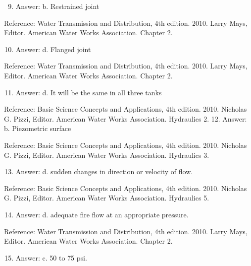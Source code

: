 \documentclass[10pt]{article}
\begin{document}
\begin{enumerate}
  \setcounter{enumi}{8}
  \item Answer: b. Restrained joint
\end{enumerate}

Reference: Water Transmission and Distribution, 4th edition. 2010. Larry Mays, Editor. American Water Works Association. Chapter 2.

\begin{enumerate}
  \setcounter{enumi}{9}
  \item Answer: d. Flanged joint
\end{enumerate}

Reference: Water Transmission and Distribution, 4th edition. 2010. Larry Mays, Editor. American Water Works Association. Chapter 2.

\begin{enumerate}
  \setcounter{enumi}{10}
  \item Answer: d. It will be the same in all three tanks
\end{enumerate}

Reference: Basic Science Concepts and Applications, 4th edition. 2010. Nicholas G. Pizzi, Editor. American Water Works Association. Hydraulics 2. 12. Answer: b. Piezometric surface

Reference: Basic Science Concepts and Applications, 4th edition. 2010. Nicholas G. Pizzi, Editor. American Water Works Association. Hydraulics 3.

\begin{enumerate}
  \setcounter{enumi}{12}
  \item Answer: d. sudden changes in direction or velocity of flow.
\end{enumerate}

Reference: Basic Science Concepts and Applications, 4th edition. 2010. Nicholas G. Pizzi, Editor. American Water Works Association. Hydraulics 5.

\begin{enumerate}
  \setcounter{enumi}{13}
  \item Answer: d. adequate fire flow at an appropriate pressure.
\end{enumerate}

Reference: Water Transmission and Distribution, 4th edition. 2010. Larry Mays, Editor. American Water Works Association. Chapter 2.

\begin{enumerate}
  \setcounter{enumi}{14}
  \item Answer: c. 50 to 75 psi.
\end{enumerate}
\end{document}
